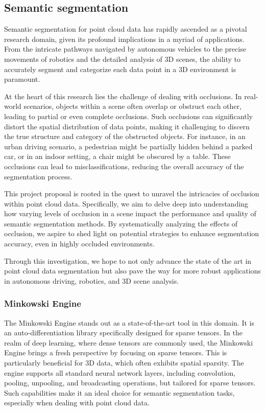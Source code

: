 \documentclass[11pt, a4paper,oneside,chapterprefix=false]{scrbook}
\begin{document}
\subsection{Semantic segmentation}
Semantic segmentation for point cloud data has rapidly ascended as a pivotal research domain, given its profound implications in a myriad of applications. From the intricate pathways navigated by autonomous vehicles to the precise movements of robotics and the detailed analysis of 3D scenes, the ability to accurately segment and categorize each data point in a 3D environment is paramount.

At the heart of this research lies the challenge of dealing with occlusions. In real-world scenarios, objects within a scene often overlap or obstruct each other, leading to partial or even complete occlusions. Such occlusions can significantly distort the spatial distribution of data points, making it challenging to discern the true structure and category of the obstructed objects. For instance, in an urban driving scenario, a pedestrian might be partially hidden behind a parked car, or in an indoor setting, a chair might be obscured by a table. These occlusions can lead to misclassifications, reducing the overall accuracy of the segmentation process.

This project proposal is rooted in the quest to unravel the intricacies of occlusion within point cloud data. Specifically, we aim to delve deep into understanding how varying levels of occlusion in a scene impact the performance and quality of semantic segmentation methods. By systematically analyzing the effects of occlusion, we aspire to shed light on potential strategies to enhance segmentation accuracy, even in highly occluded environments.

Through this investigation, we hope to not only advance the state of the art in point cloud data segmentation but also pave the way for more robust applications in autonomous driving, robotics, and 3D scene analysis.

\subsubsection{Minkowski Engine}

The Minkowski Engine stands out as a state-of-the-art tool in this domain. It is an auto-differentiation library specifically designed for sparse tensors. In the realm of deep learning, where dense tensors are commonly used, the Minkowski Engine brings a fresh perspective by focusing on sparse tensors. This is particularly beneficial for 3D data, which often exhibits spatial sparsity. The engine supports all standard neural network layers, including convolution, pooling, unpooling, and broadcasting operations, but tailored for sparse tensors. Such capabilities make it an ideal choice for semantic segmentation tasks, especially when dealing with point cloud data.
\end{document}
